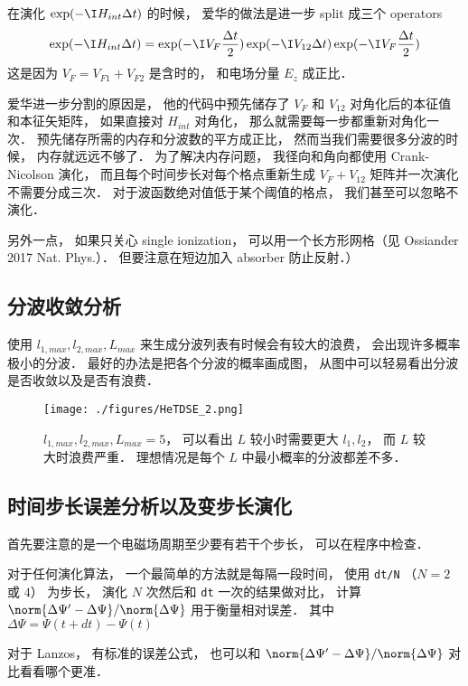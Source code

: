 在演化 $\exp(-\I H_{int}\Delta t)$ 的时候， 爱华的做法是进一步 split 成三个 operators
\begin{equation}\label{HeTDSE_eq4}
\exp(-\I H_{int}\Delta t) = \exp(-\I V_F\frac{\Delta t}{2})   \exp(-\I V_{12} \Delta t) \exp(-\I V_F\frac{\Delta t}{2})
\end{equation}
这是因为 $V_F = V_{F1} + V_{F2}$ 是含时的， 和电场分量 $E_z$ 成正比．

爱华进一步分割的原因是， 他的代码中预先储存了 $V_F$ 和 $V_{12}$ 对角化后的本征值和本征矢矩阵， 如果直接对 $H_{int}$ 对角化， 那么就需要每一步都重新对角化一次． 预先储存所需的内存和分波数的平方成正比， 然而当我们需要很多分波的时候， 内存就远远不够了． 为了解决内存问题， 我径向和角向都使用 Crank-Nicolson 演化， 而且每个时间步长对每个格点重新生成 $V_F + V_{12}$ 矩阵并一次演化不需要分成三次． 对于波函数绝对值低于某个阈值的格点， 我们甚至可以忽略不演化．

另外一点， 如果只关心 single ionization， 可以用一个长方形网格（见 Ossiander 2017 Nat. Phys.）． 但要注意在短边加入 absorber 防止反射．）

\subsection{分波收敛分析}
使用 $l_{1,max}, l_{2,max}, L_{max}$ 来生成分波列表有时候会有较大的浪费， 会出现许多概率极小的分波． 最好的办法是把各个分波的概率画成图， 从图中可以轻易看出分波是否收敛以及是否有浪费．
\begin{figure}[ht]
\centering
\texttt{[image: ./figures/HeTDSE\_2.png]}
\caption{$l_{1,max}, l_{2,max}, L_{max} = 5$， 可以看出 $L$ 较小时需要更大 $l_1, l_2$， 而 $L$ 较大时浪费严重． 理想情况是每个 $L$ 中最小概率的分波都差不多．} \label{HeTDSE_fig2}
\end{figure}

\subsection{时间步长误差分析以及变步长演化}
首先要注意的是一个电磁场周期至少要有若干个步长， 可以在程序中检查．

对于任何演化算法， 一个最简单的方法就是每隔一段时间， 使用 \verb|dt/N| （$N = 2$ 或 $4$） 为步长， 演化 $N$ 次然后和 \verb|dt| 一次的结果做对比， 计算 $\norm{\Delta \Psi' - \Delta \Psi}/\norm{\Delta \Psi}$ 用于衡量相对误差． 其中 $\Delta\Psi = \Psi(t+dt) - \Psi(t)$

对于 Lanzos， 有标准的误差公式， 也可以和 $\norm{\Delta \Psi' - \Delta \Psi}/\norm{\Delta \Psi}$ 对比看看哪个更准．


